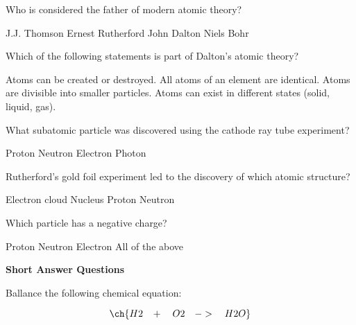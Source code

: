 \documentclass{exam}
\begin{document}
\begin{center}
\end{center}


\begin{questions}
    
\question[2] Who is considered the father of modern atomic theory?
\begin{checkboxes}
    \choice J.J. Thomson 
    \choice Ernest Rutherford
    \choice John Dalton 
    \choice Niels Bohr 
\end{checkboxes}


\question[2] Which of the following statements is part of Dalton's atomic theory?
\begin{checkboxes}
    \choice Atoms can be created or destroyed.  
    \choice All atoms of an element are identical.  
    \choice Atoms are divisible into smaller particles.  
    \choice Atoms can exist in different states (solid, liquid, gas). 
\end{checkboxes}

\question[2] What subatomic particle was discovered using the cathode ray tube experiment?
\begin{checkboxes}
    \choice Proton  
    \choice Neutron  
    \choice Electron  
    \choice Photon 
\end{checkboxes}

\question[2] Rutherford's gold foil experiment led to the discovery of which atomic structure?  
\begin{checkboxes}
    \choice Electron cloud  
    \choice Nucleus  
    \choice Proton  
    \choice Neutron  
\end{checkboxes}

\question[2] Which particle has a negative charge?
\begin{checkboxes}
    \choice Proton  
    \choice Neutron  
    \choice Electron  
    \choice All of the above  
\end{checkboxes}  



\textbf{Short Answer Questions}

\question[5] Ballance the following chemical equation:

\begin{equation}
    \ch{ H2 \;\;\;  +  \quad  O2 \quad ->  \quad H2O}
\end{equation}


\end{questions}
\end{document}
